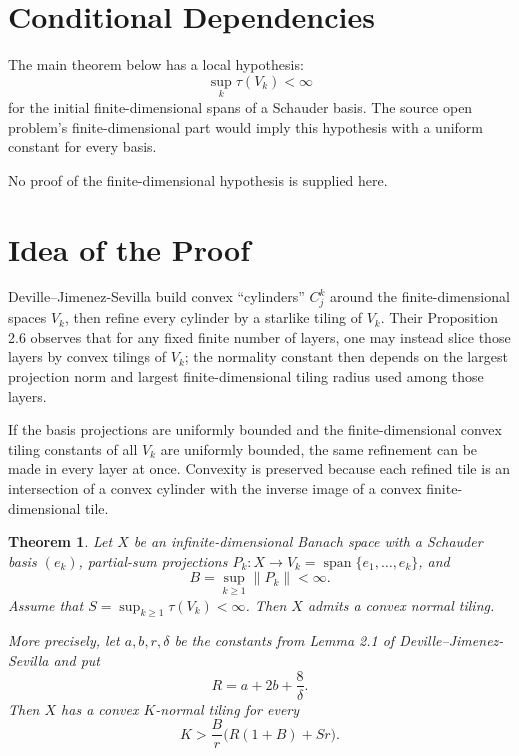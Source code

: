 \documentclass[11pt]{article}
\newtheorem{theorem}{Theorem}
\newcommand{\spanop}{\operatorname{span}}
\begin{document}
\section*{Conditional Dependencies}

The main theorem below has a local hypothesis:
\[
   \sup_k \tau(V_k)<\infty
\]
for the initial finite-dimensional spans of a Schauder basis. The source open
problem's finite-dimensional part would imply this hypothesis with a uniform
constant for every basis.

No proof of the finite-dimensional hypothesis is supplied here.

\section*{Idea of the Proof}

Deville--Jimenez-Sevilla build convex ``cylinders'' $C^k_j$ around the
finite-dimensional spaces $V_k$, then refine every cylinder by a starlike
tiling of $V_k$. Their Proposition 2.6 observes that for any fixed finite
number of layers, one may instead slice those layers by convex tilings of
$V_k$; the normality constant then depends on the largest projection norm and
largest finite-dimensional tiling radius used among those layers.

If the basis projections are uniformly bounded and the finite-dimensional
convex tiling constants of all $V_k$ are uniformly bounded, the same refinement
can be made in every layer at once. Convexity is preserved because each refined
tile is an intersection of a convex cylinder with the inverse image of a convex
finite-dimensional tile.

\begin{theorem}
Let $X$ be an infinite-dimensional Banach space with a Schauder basis
$(e_k)$, partial-sum projections $P_k:X\to V_k=\spanop\{e_1,\ldots,e_k\}$, and
\[
   B=\sup_{k\ge 1}\|P_k\|<\infty.
\]
Assume that $S=\sup_{k\ge 1}\tau(V_k)<\infty$. Then $X$ admits a convex normal
tiling.

More precisely, let $a,b,r,\delta$ be the constants from Lemma 2.1 of
Deville--Jimenez-Sevilla and put
\[
   R=a+2b+\frac{8}{\delta}.
\]
Then $X$ has a convex $K$-normal tiling for every
\[
   K>\frac{B}{r}\bigl(R(1+B)+Sr\bigr).
\]
\end{theorem}
\end{document}
